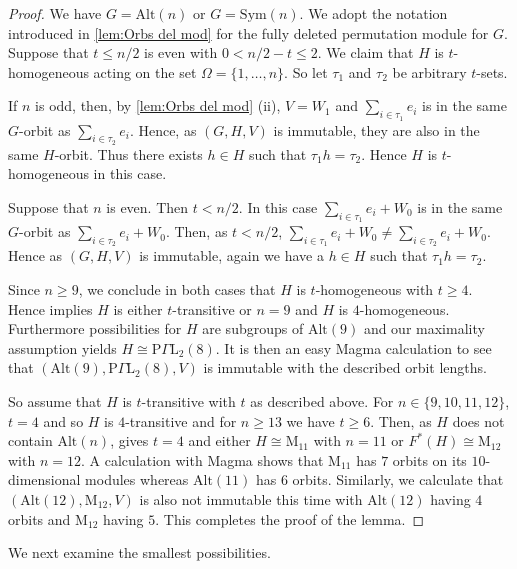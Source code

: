 \documentclass[12pt]{amsart}
\theoremstyle{remark}
\theoremstyle{notation}
\theoremstyle{definition}
\newcommand{\0}{\emptyset}
\newcommand{\Sym}{\mathrm{Sym}}
\newcommand{\Alt}{\mathrm{Alt}}
\begin{document}
\begin{proof} We have $G =\Alt(n)$ or $G=\Sym(n)$. We adopt the notation introduced in \cref{lem:Orbs del mod} for the fully deleted permutation module for $G$.
Suppose that $t \le n/2$ is even with $0<n/2-t \le 2$. We claim that $H$ is $t$-homogeneous acting on the set $\Omega=\{1, \dots, n\}$.  So let $\tau_1 $ and $\tau_2$ be arbitrary $t$-sets.

If $n$ is odd, then, by \cref{lem:Orbs del mod}  (ii), $V=W_1$ and $\sum_{i\in \tau_1}e_i$ is in the same $G$-orbit as $\sum_{i\in \tau_2}e_i$. Hence, as $( G,H,V)$ is immutable, they are also in the same $H$-orbit.  Thus there exists $h\in H$ such that $\tau_1h=\tau_2$. Hence $H$ is $t$-homogeneous in this case.

Suppose that $n$ is even. Then $t < n/2$. In this case $\sum_{i\in \tau_1}e_i+W_0$ is in the same $G$-orbit as $\sum_{i\in \tau_2}e_i+W_0$. Then, as $t < n/2$, $\sum_{i\in \tau_1}e_i+W_0\ne \sum_{i\in \tau_2}e_i+W_0$. Hence as   $(G,H,V)$ is immutable, again we have a $h\in H$ such that $\tau_1h=\tau_2$.

Since $n \ge 9$, we conclude in both cases that $H$ is  $t$-homogeneous with $t \ge 4$. Hence \cite[Theorem 1]{Kantorhom} implies  $H$ is either $t$-transitive or $n=9$ and  $H$ is $4$-homogeneous. Furthermore possibilities for $H$ are subgroups of $\Alt(9)$  and our maximality assumption yields $H \cong \mathrm P\Gamma\mathrm L_2(8)$. It is then an easy {\sc Magma} calculation to see that $(\Alt(9), \mathrm P\Gamma\mathrm L_2(8), V)$ is immutable with the described orbit lengths.

So assume that $H$ is $t$-transitive with $t$ as described above.
For $n \in \{9,10,11,12\}$, $t=4$ and so $H$ is $4$-transitive and for $n \ge 13$ we have $t \ge 6$.
 Then, as $H$ does not contain $\Alt(n)$, \cite[Theorem 4.11, pg. 110]{CameronPermutationGroups}  gives $t=4$ and  either $H \cong \mathrm M_{11}$ with $n=11$ or $F^*(H)\cong \mathrm M_{12}$ with $n=12$. A calculation with {\sc Magma} shows that $\mathrm M_{11}$ has $7$ orbits on its $10$-dimensional modules whereas $\Alt(11)$ has $6$ orbits. Similarly, we calculate that $(\Alt(12),\mathrm M_{12},V)$ is also not immutable this time with $\Alt(12)$ having $4$ orbits and $\mathrm M_{12}$ having $5$. This completes the proof of the lemma.
\end{proof}

We next examine the smallest possibilities.
\end{document}
